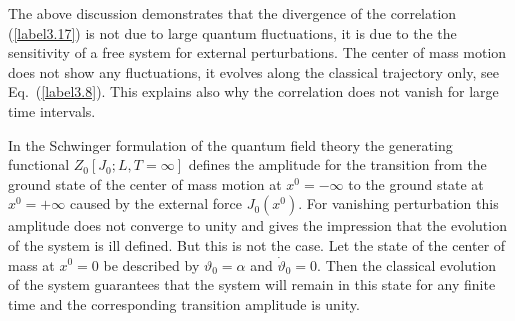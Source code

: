 \documentclass[a4paper,12pt] {article}
\begin{document}
The above discussion demonstrates that the divergence of the
correlation (\ref{label3.17}) is not due to large quantum
fluctuations, it is due to the the sensitivity of a free system for
external perturbations. The center of mass motion does not show any
fluctuations, it evolves along the classical trajectory only, see
Eq.~(\ref{label3.8}). This explains also why the correlation does not
vanish for large time intervals.

In the Schwinger formulation of the quantum field theory \cite{SW70}
the generating functional $Z_0[J_0; L, T=\infty]$ defines the
amplitude for the transition from the ground state of the center of
mass motion at $x^0 = -\infty$ to the ground state at $x^0 = +\infty$
caused by the external force $J_0(x^0)$. For vanishing perturbation
this amplitude does not converge to unity and gives the impression
that the evolution of the system is ill defined. But this is not the
case. Let the state of the center of mass at $x^0=0$ be described by
$\vartheta_0=\alpha$ and $\dot{\vartheta}_0 = 0$. Then the classical
evolution of the system guarantees that the system will remain in this
state for any finite time and the corresponding transition amplitude
is unity.
\end{document}
